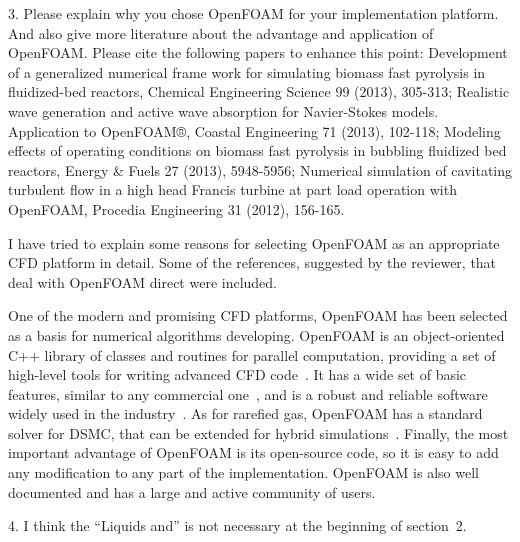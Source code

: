 \documentclass{article}
\begin{document}
\begin{quoting}
3. Please explain why you chose OpenFOAM for your implementation
platform. And also give more literature about the advantage and
application of OpenFOAM. Please cite the following papers to enhance
this point: Development of a generalized numerical frame work for
simulating biomass fast pyrolysis in fluidized-bed reactors, Chemical
Engineering Science 99 (2013), 305-313; Realistic wave generation and
active wave absorption for Navier-Stokes models. Application to OpenFOAM®,
Coastal Engineering 71 (2013), 102-118; Modeling effects of operating
conditions on biomass fast pyrolysis in bubbling fluidized bed reactors,
Energy \& Fuels 27 (2013), 5948-5956; Numerical simulation of cavitating
turbulent flow in a high head Francis turbine at part load operation
with OpenFOAM, Procedia Engineering 31 (2012), 156-165.
\end{quoting}

I have tried to explain some reasons for selecting
OpenFOAM\textregistered{} as an appropriate CFD platform in detail. Some
of the references, suggested by the reviewer, that deal with
OpenFOAM\textregistered{} direct were included.

\begin{leftbar}
One of the modern and promising CFD platforms, OpenFOAM\textregistered{}
has been selected as a basis for numerical algorithms developing.
OpenFOAM\textregistered{} is an object-oriented C++ library of classes and routines for parallel computation,
providing a set of high-level tools for writing advanced CFD code~\cite{OpenFOAM1998}.
It has a wide set of basic features, similar to any commercial one~\cite{OpenFOAM2010},
and is a robust and reliable software widely used in the industry~\cite{BoilingFlows2009,
TurbulentCombustion2011, CoastalEngineering2013, BiomassPyrolysis2013}.
As for rarefied gas, OpenFOAM\textregistered{} has a standard solver for DSMC, that
can be extended for hybrid simulations~\cite{HybridSolver2012}.
Finally, the most important advantage of OpenFOAM\textregistered{} is its open-source code,
so it is easy to add any modification to any part of the implementation.
OpenFOAM\textregistered{} is also well documented and has a large and active community of users.
\end{leftbar}

\begin{quoting}
4. I think the ``Liquids and'' is not necessary at the beginning of
section~2.
\end{quoting} 
\end{document}
